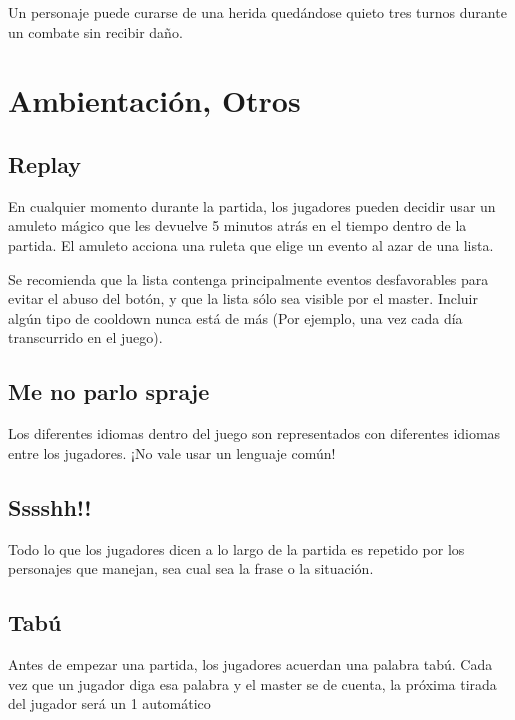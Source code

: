 Un personaje puede curarse de una herida quedándose quieto tres turnos durante un combate sin recibir daño.

\section{Ambientación, Otros}

\subsection*{Replay}

En cualquier momento durante la partida, los jugadores pueden decidir usar un amuleto mágico que les devuelve 5 minutos atrás en el tiempo dentro de la partida. El amuleto acciona una ruleta que elige un evento al azar de una lista.

Se recomienda que la lista contenga principalmente eventos desfavorables para evitar el abuso del botón, y que la lista sólo sea visible por el master. Incluir algún tipo de cooldown nunca está de más (Por ejemplo, una vez cada día transcurrido en el juego).

\subsection*{Me no parlo spraje}

Los diferentes idiomas dentro del juego son representados con diferentes idiomas entre los jugadores. ¡No vale usar un lenguaje común!

\subsection*{Sssshh!!}

Todo lo que los jugadores dicen a lo largo de la partida es repetido por los personajes que manejan, sea cual sea la frase o la situación.

\subsection*{Tabú}

Antes de empezar una partida, los jugadores acuerdan una palabra tabú. Cada vez que un jugador diga esa palabra y el master se de cuenta, la próxima tirada del jugador será un 1 automático

